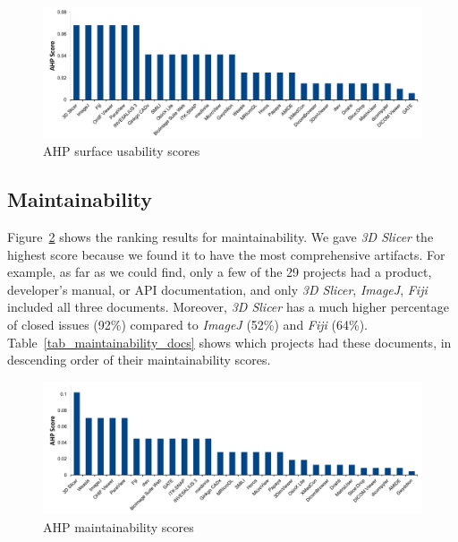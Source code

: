 \documentclass[11pt]{article}
\begin{document}
\begin{figure}[!ht]
\includegraphics[scale=0.47]{usability_scores.pdf}
\caption{AHP surface usability scores}
\label{fg_usability_scores}
\end{figure}
 
\subsection{Maintainability} \label{sec_score_maintainability}

Figure~\ref{fg_maintainability_scores} shows the ranking results for
maintainability. We gave \textit{3D Slicer} the highest score because we found
it to have the most comprehensive artifacts. For example, as far as we could
find, only a few of the 29 projects had a product, developer's manual, or API
documentation, and only \textit{3D Slicer}, \textit{ImageJ}, \textit{Fiji}
included all three documents. Moreover, \textit{3D Slicer} has a much higher
percentage of closed issues (92\%) compared to \textit{ImageJ} (52\%) and
\textit{Fiji} (64\%). Table~\ref{tab_maintainability_docs} shows which
projects had these documents, in descending order of their maintainability
scores. 

\begin{figure}[!ht]
\includegraphics[scale=0.47]{maintainability_scores.pdf}
\caption{AHP maintainability scores}
\label{fg_maintainability_scores}
\end{figure}
\end{document}
